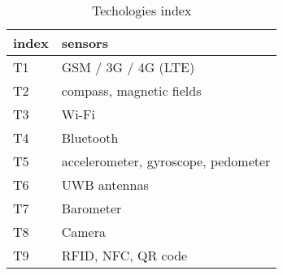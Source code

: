 \setlength{\tabcolsep}{0.5em} %
\renewcommand{\arraystretch}{2} %
\begin{table}[ht!]
	\caption{Techologies index}
	\label{tab:techindex}
	\begin{tabular}{|l|l|}
		\hline
		index & sensors \\ \hline
		T1 & GSM / 3G / 4G (LTE) \\ \hline
		T2 & compass, magnetic fields \\ \hline
		T3 & Wi-Fi \\ \hline
		T4 & Bluetooth \\ \hline
		T5 & accelerometer, gyroscope, pedometer \\ \hline
		T6 & UWB antennas \\ \hline
		T7 & Barometer \\ \hline
		T8 & Camera \\ \hline
		T9 & RFID, NFC, QR code \\ \hline
	\end{tabular}%
\end{table}
